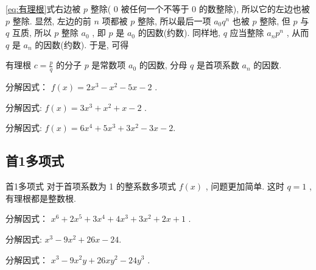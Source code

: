 \documentclass[aspectratio=169]{ctexbeamer}
\theoremstyle{definition}
\begin{document}
\begin{frame}
	\ref{eq:有理根}式右边被 $p$ 整除( 0 被任何一个不等于 0 的数整除), 所以它的左边也被 $p$ 整除. 显然, 左边的前 $n$ 项都被 $p$ 整除, 所以最后一项 $a_{0} q^{n}$ 也被 $p$ 整除, 但 $p$ 与 $q$ 互质, 所以 $p$ 整除 $a_{0}$ , 即 $p$ 是 $a_{0}$ 的因数(约数). 同样地,  $q$ 应当整除 $a_{n} p^{n}$ , 从而 $q$ 是 $a_{n}$ 的因数(约数). 于是, 可得
	\begin{block}{}
		有理根 $c=\frac{p}{q}$ 的分子 $p$ 是常数项 $a_{0}$ 的因数, 分母 $q$ 是首项系数 $a_{n}$ 的因数.
	\end{block}
\end{frame}

\begin{frame}[t]
	\begin{example}
		分解因式： $f(x)=2 x^{3}-x^{2}-5 x-2$ . 
	\end{example}
\end{frame}

\begin{frame}[t]
	\begin{example}
		分解因式: $f(x)=3 x^{3}+x^{2}+x-2$ . 
	\end{example}
\end{frame}

\begin{frame}[t]
	\begin{example}
		分解因式: $f(x)=6 x^{4}+5 x^{3}+3 x^{2}-3 x-2$.
	\end{example}
\end{frame}

\subsection{首1多项式}
\begin{frame}[t]{首1多项式}
	对于首项系数为 1 的整系数多项式 $f(x)$ , 问题更加简单. 这时 $q=1$ , 有理根都是整数根. 
	\begin{example}
		分解因式： $x^{6}+2 x^{5}+3 x^{4}+4 x^{3}+3 x^{2}+2 x+1$ . 
	\end{example}
\end{frame}

\begin{frame}[t]
	\begin{example}
		分解因式: $x^{3}-9 x^{2}+26 x-24$.
	\end{example}
\end{frame}

\begin{frame}[t]
	\begin{example}
		分解因式： $x^{3}-9 x^{2} y+26 x y^{2}-24 y^{3}$ . 
	\end{example}
\end{frame}
\end{document}
